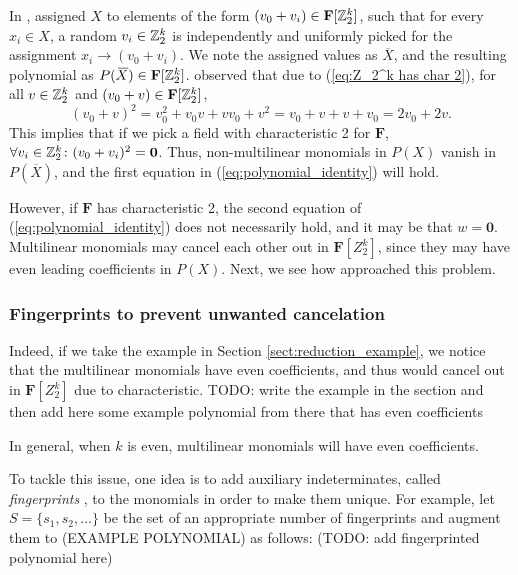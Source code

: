 In \cite{Koutis08}, \citeauthor{Koutis08} assigned $X$ 
to elements of the form $(v_0 + v_i) \in \mathbf{F}[\mathbb Z_2^k]$, 
such that for every $x_i \in X$, a random $v_i \in \mathbb Z_2^k$ is independently and uniformly 
picked for the assignment 
$x_i \to (v_0 + v_i)$. 
We note the assigned values as $\overbar{X}$, and the resulting polynomial as $P(\,\overline{\!{X}}) \in \mathbf{F}[\mathbb Z_2^k]$. 
\citeauthor{Koutis08} observed that 
due to (\ref{eq:Z_2^k has char 2}), for all $v \in \mathbb Z_2^k$ and $(v_0 + v) \in \mathbf{F}[\mathbb Z_2^k]$, 
\[
  (v_0 + v)^2 = v_0^2 + v_0v + vv_0 + v^2 = v_0 + v + v + v_0 = 2v_0 + 2v.
\]
This implies that if we pick a field with characteristic 2 for $\mathbf{F}$, 
$\forall v_i \in \mathbb Z_2^k \colon (v_0 + v_i)^2 = \mathbf{0}$. Thus, 
non-multilinear monomials in $P(X)$ vanish in $P(\overbar{X})$, and the 
first equation in (\ref{eq:polynomial_identity}) 
will hold.

However, if $\mathbf{F}$ has characteristic 2, the second equation of (\ref{eq:polynomial_identity}) 
does not necessarily hold, and it may be that $w = \mathbf{0}$. Multilinear monomials may 
cancel each other out in $\mathbf{F}[Z_2^k]$, since they may have even leading 
coefficients in $P(X)$. Next, we see how \citeauthor{Koutis08} approached this problem.

\subsubsection{Fingerprints to prevent unwanted cancelation}
\label{sect:fingerprints}

Indeed, if we take the example in Section \ref{sect:reduction_example}, 
we notice that the multilinear monomials have even coefficients, and thus 
would cancel out in $\mathbf{F}[Z_2^k]$ due to characteristic. TODO: 
write the example in the section and then 
add here some   
example polynomial from there that has even coefficients

In general, when $k$ is even, multilinear monomials will have even coefficients. 

To tackle this issue, one idea is to add auxiliary indeterminates, 
called \emph{fingerprints} \cite{KouWil15}, to the monomials 
in order to make them unique. For example, let $S = \{s_1, s_2, \ldots\}$ 
be the set of an appropriate number of fingerprints 
and augment them to (EXAMPLE POLYNOMIAL) as follows: 
(TODO: add fingerprinted polynomial here) 

